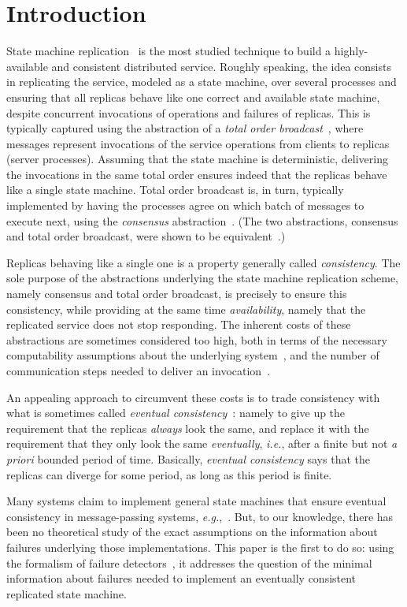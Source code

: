 \documentclass[11pt]{article}
\begin{document}
\section{Introduction}


State machine replication~\cite{Lam77,Sch90}  is the most studied
technique to build a highly-available and consistent distributed
service.
Roughly speaking, the idea consists in replicating the service, modeled as a state machine,
over several processes and ensuring that all replicas behave like one
correct and available state machine,
despite concurrent invocations of operations and failures of
replicas.
This is typically captured using the abstraction of a \emph{total
  order broadcast}~\cite{CT96}, where messages represent invocations
of the service operations from clients to replicas (server
processes).
Assuming that the state machine is
deterministic, delivering the invocations in the same total order
ensures indeed that the replicas behave like a single state
machine. Total order broadcast is, in turn, typically implemented by
having the processes agree on which batch of messages to execute next,
using the \emph{consensus} abstraction~\cite{Lam98,CT96}.
(The two abstractions, consensus and total order broadcast, were shown to be equivalent~\cite{CT96}.)

Replicas behaving like a single one is a
property generally called \emph{consistency}. The
sole purpose of the  abstractions underlying the state machine
replication scheme, namely consensus and total order broadcast, is precisely to ensure
this consistency, while providing at the same time \emph{availability},
namely that the replicated service does not stop responding. The inherent costs
of these abstractions are sometimes considered too high, both in
terms of
the necessary computability assumptions about the underlying
system~\cite{FLP85,CHT96,Bre00}, and
the number of communication steps needed to deliver an
invocation~\cite{Lam98,Lam06}.

An appealing approach to circumvent these costs is to trade
consistency with what is sometimes called \emph{eventual consistency}~\cite{SS05, Vogels2009}:
namely to give up the requirement that the replicas  \emph{always} look the
same, and replace it with the requirement that they only look the same
\emph{eventually}, {\em i.e.}, after a finite but not \emph{a priori} bounded
period of time.
Basically, \emph{eventual consistency} says that the replicas can
diverge for some period, as long as this period is finite.

Many systems claim to implement general state machines that ensure
eventual consistency in message-passing  systems, {\em
  e.g.},~\cite{Cassandra, DeCandia2007}.
But, to our knowledge,  there has been no theoretical study of the
exact assumptions on the information about failures underlying those implementations.
This paper is the first to do so:  using the  formalism of failure detectors~\cite{CT96,CHT96},
it addresses the question of the minimal information about failures needed to implement an eventually consistent replicated state machine.
\end{document}
